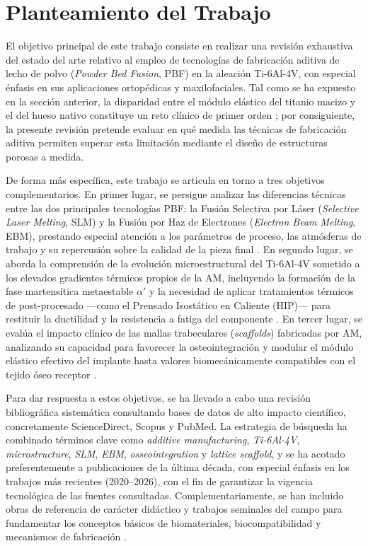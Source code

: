 \section{Planteamiento del Trabajo}
\label{sec:planteamiento}

El objetivo principal de este trabajo consiste en realizar una revisión exhaustiva del estado del arte relativo al empleo de tecnologías de fabricación aditiva de lecho de polvo (\textit{Powder Bed Fusion}, PBF) en la aleación Ti-6Al-4V, con especial énfasis en sus aplicaciones ortopédicas y maxilofaciales. Tal como se ha expuesto en la sección anterior, la disparidad entre el módulo elástico del titanio macizo y el del hueso nativo constituye un reto clínico de primer orden \cite{park,ratner}; por consiguiente, la presente revisión pretende evaluar en qué medida las técnicas de fabricación aditiva permiten superar esta limitación mediante el diseño de estructuras porosas a medida.

De forma más específica, este trabajo se articula en torno a tres objetivos complementarios. En primer lugar, se persigue analizar las diferencias técnicas entre las dos principales tecnologías PBF: la Fusión Selectiva por Láser (\textit{Selective Laser Melting}, SLM) y la Fusión por Haz de Electrones (\textit{Electron Beam Melting}, EBM), prestando especial atención a los parámetros de proceso, las atmósferas de trabajo y su repercusión sobre la calidad de la pieza final \cite{neikter2018microstructural,zhai2016microstructure}. En segundo lugar, se aborda la comprensión de la evolución microestructural del Ti-6Al-4V sometido a los elevados gradientes térmicos propios de la AM, incluyendo la formación de la fase martensítica metaestable $\alpha'$ y la necesidad de aplicar tratamientos térmicos de post-procesado ---como el Prensado Isostático en Caliente (HIP)--- para restituir la ductilidad y la resistencia a fatiga del componente \cite{nguyen2022critical}. En tercer lugar, se evalúa el impacto clínico de las mallas trabeculares (\textit{scaffolds}) fabricadas por AM, analizando su capacidad para favorecer la osteointegración y modular el módulo elástico efectivo del implante hasta valores biomecánicamente compatibles con el tejido óseo receptor \cite{misiaszek20243d,li2024biomimetic,kilina2024influence}.

Para dar respuesta a estos objetivos, se ha llevado a cabo una revisión bibliográfica sistemática consultando bases de datos de alto impacto científico, concretamente ScienceDirect, Scopus y PubMed. La estrategia de búsqueda ha combinado términos clave como \textit{additive manufacturing}, \textit{Ti-6Al-4V}, \textit{microstructure}, \textit{SLM}, \textit{EBM}, \textit{osseointegration} y \textit{lattice scaffold}, y se ha acotado preferentemente a publicaciones de la última década, con especial énfasis en los trabajos más recientes (2020--2026), con el fin de garantizar la vigencia tecnológica de las fuentes consultadas. Complementariamente, se han incluido obras de referencia de carácter didáctico y trabajos seminales del campo para fundamentar los conceptos básicos de biomateriales, biocompatibilidad y mecanismos de fabricación \cite{park,ratner,neikter2018microstructural,zhai2016microstructure}.

